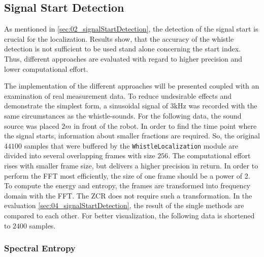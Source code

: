 \subsection{Signal Start Detection}
\label{subsec:03_signalStartDetection}

As mentioned in \cref{sec:02_signalStartDetection}, the detection of the
signal start is crucial for the localization.
Results  show, that the accuracy of the whistle detection is not
sufficient to be used stand alone concerning the start index.
Thus, different approaches are evaluated with regard to higher
precision and lower computational effort.

The implementation of the different approaches will be presented coupled with
an examination of real measurement data.
To reduce undesirable effects and demonstrate the simplest form, a sinusoidal
signal of $3\si{\kilo\hertz}$ was recorded with the same circumstances as the
whistle-sounds.
For the following data, the sound source was placed $2\si{m}$ in front of the robot.
In order to find the time point where the signal starts, information about
smaller fractions are required.
So, the original $44100$ samples that were buffered by the
\lstinline!WhistleLocalization! module are divided into several overlapping
frames with size $256$. The computational effort rises with smaller frame size,
but delivers a higher precision in return.
In order to perform the \ac{FFT} most efficiently, the size of one frame
should be a power of 2.
To compute the energy and entropy, the frames are transformed into
frequency domain with the \ac{FFT}.
The \ac{ZCR} does not require such a transformation.
In the evaluation \cref{sec:04_signalStartDetection}, the result of the single
methods are compared to each other.
For better visualization, the following data is shortened to $2400$ samples.


\subsubsection*{Spectral Entropy}

